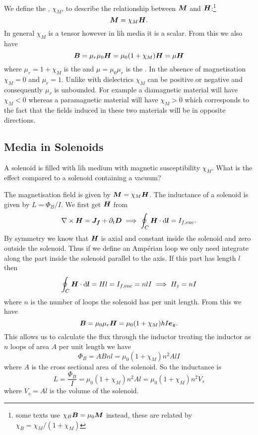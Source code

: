     We define the , \(\chi_M\), to describe the relationship between \(\bm{M}\) and \(\bm{H}\):\footnote{some texts use \(\chi_B\bm{B} = \mu_0\bm{M}\) instead, these are related by \(\chi_B = \chi_M/(1 + \chi_M)\)}
    \[\bm{M} = \chi_M\bm{H}.\]
    In general \(\chi_M\) is a tensor however in \gls{lih} media it is a scalar.
    From this we also have
    \[\bm{B} = \mu_r\mu_0\bm{H} = \mu_0(1 + \chi_M)\bm{H} = \mu\bm{H}\]
    where \(\mu_r = 1 + \chi_M\) is the  and \(\mu = \mu_0\mu_r\) is the .
    In the absence of magnetisation \(\chi_M = 0\) and \(\mu_r = 1\).
    Unlike with dielectrics \(\chi_M\) can be positive or negative and consequently \(\mu_r\) is unbounded.
    For example a diamagnetic material will have \(\chi_M < 0\) whereas a paramagnetic material will have \(\chi_M > 0\) which corresponds to the fact that the fields induced in these two materials will be in opposite directions.
    
    \subsection{Media in Solenoids}
    A solenoid is filled with \gls{lih} medium with magnetic susceptibility \(\chi_M\).
    What is the effect compared to a solenoid containing a vacuum?
    
    The magnetisation field is given by \(\bm{M} = \chi_M\bm{H}\).
    The inductance of a solenoid is given by \(L = \Phi_B/I\).
    We first get \(\bm{H}\) from
    \[\nabla\times\bm{H} = \bm{J_f} + \partial_t\bm{D} \implies \oint_C \bm{H}\cdot\dd{\bm{l}} = I_{f, {\mathrm{enc}}}.\]
    By symmetry we know that \(\bm{H}\) is axial and constant inside the solenoid and zero outside the solenoid.
    Thus if we define an Amp\'erian loop we only need integrate along the part inside the solenoid parallel to the axis.
    If this part has length \(l\) then
    \[\oint_C\bm{H}\cdot\dd{\bm{l}} = Hl = I_{f, {\mathrm{enc}}} = nlI \implies H_z = nI\]
    where \(n\) is the number of loops the solenoid has per unit length.
    From this we have
    \[\bm{B} = \mu_0\mu_r\bm{H} = \mu_0(1 + \chi_M)hI\bm{e_{z}}.\]
    This allows us to calculate the flux through the inductor treating the inductor as \(n\) loops of area \(A\) per unit length we have
    \[\Phi_B = ABnl = \mu_0(1 + \chi_M)n^2AlI\]
    where \(A\) is the cross sectional area of the solenoid.
    So the inductance is
    \[L = \frac{\Phi_B}{I} = \mu_0(1 + \chi_M)n^2Al = \mu_0(1 + \chi_M)n^2V_s\]
    where \(V_s = Al\) is the volume of the solenoid.
    
